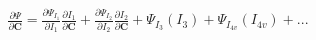 \documentclass[preview]{standalone}
\begin{document}
\begin{align*}
\frac{\partial \Psi}{\partial \mathbf{C}}  =  \frac{\partial \Psi_{I_1}}{\partial I_1}\frac{\partial I_1}{\partial \mathbf{C}}  +  \frac{\partial \Psi_{I_2}}{\partial I_2}\frac{\partial I_2}{\partial \mathbf{C}}  +  \Psi_{I_3}(I_3)  +  \Psi_{I_{4v}}(I_{4v})  + ...
\end{align*}
\end{document}
